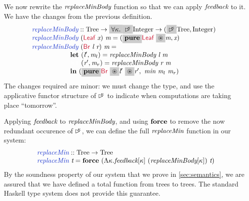 We now rewrite the $\textit{replaceMinBody}$ function so that we can
apply $\textit{feedback}$ to it. We have  the
changes from the previous definition.
\begin{displaymath}
  \begin{array}{@{}l}
    \defn{replaceMinBody} :: \tyname{Tree} \to \hlchangem{\forall \kappa.}\hlchangem{\delay\kappa}\tyname{Integer} \to (\hlchangem{\delay\kappa}\tyname{Tree},\tyname{Integer}) \\
    \hspace{0cm} \defn{replaceMinBody}\ (\cons{Leaf}\ \ident{x})\ \ident{m} = (\hlchangem{\kw{pure}}\cons{Leaf}\ \hlchangem{\circledast}\ident{m}, \ident{x}) \\
    \hspace{0cm} \defn{replaceMinBody}\ (\cons{Br}\ \ident{l}\ \ident{r})\ \ident{m} = \\
    \hspace{2cm} \kw{let}\ (\ident{l$'$}, \ident{m$_l$}) = \ident{replaceMinBody}\ \ident{l}\ \ident{m} \\
    \hspace{2cm} \textcolor{white}{\kw{let}\ }(\ident{r$'$}, \ident{m$_r$}) = \ident{replaceMinBody}\ \ident{r}\ \ident{m} \\
    \hspace{2cm} \kw{in}\ (\hlchangem{\kw{pure}}\cons{Br}\ \hlchangem{\circledast}\ident{l$'$}\ \hlchangem{\circledast}\ident{r$'$},\ \ident{min}\ \ident{m$_l$}\ \ident{m$_r$})
  \end{array}
\end{displaymath}
The changes required are minor: we must change the type, and use the
applicative functor structure of $\mathord{\rhd\kern-0.4em^{\kappa}}$ to indicate when
computations are taking place ``tomorrow''.

Applying $\textit{feedback}$ to $\textit{replaceMinBody}$, and using
$\textbf{force}$ to remove the now redundant occurence of $\mathord{\rhd\kern-0.4em^{\kappa}}$,
we can define the full $\textit{replaceMin}$ function in our system:
\begin{displaymath}
  \begin{array}{l}
    \defn{replaceMin} :: \tyname{Tree} \to \tyname{Tree} \\
    \defn{replaceMin}\ \ident{t} = \kw{force}\ (\Lambda \kappa. \ident{feedback}[\kappa]\ (\ident{replaceMinBody}[\kappa])\ \ident{t})
  \end{array}
\end{displaymath}
By the soundness property of our system that we prove in
\autoref{sec:semantics}, we are assured that we have defined a total
function from trees to trees. The standard Haskell type system does
not provide this guarantee.


